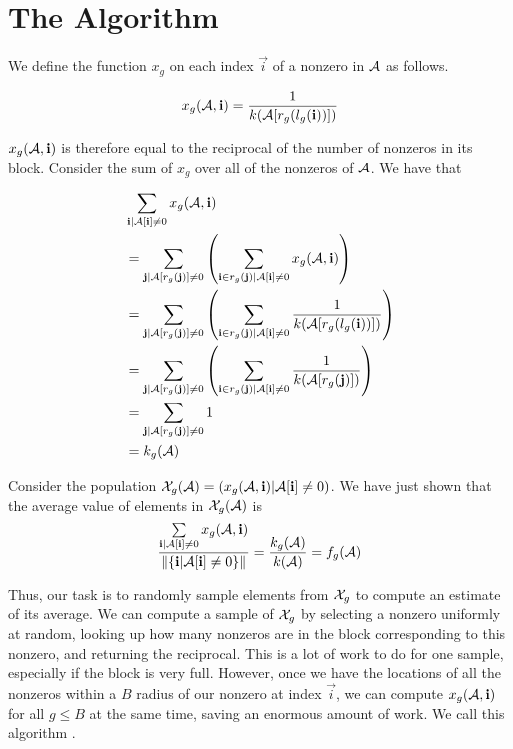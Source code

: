 
\section{The Algorithm}

    We define the function $x_g$ on each index $\vec{i}$ of a nonzero in $\mathbf{\mathcal{A}}$ as follows.

    \[
      x_g(\mathbf{\mathcal{A}}, \mathbf{i}) = \frac{1}{k(\mathbf{\mathcal{A}}[r_g(l_g(\mathbf{i}))])}
    \]

    $x_g(\mathbf{\mathcal{A}}, \mathbf{i})$ is therefore equal to the reciprocal of the number of nonzeros in its block. Consider the sum of $x_g$ over all of the nonzeros of $\mathbf{\mathcal{A}}$. We have that

    \begin{align*}
      &\sum\limits_{\mathbf{i} | \mathbf{\mathcal{A}}[\mathbf{i}] \neq 0} x_g(\mathbf{\mathcal{A}}, \mathbf{i})\\ &= \sum\limits_{\mathbf{j} | \mathbf{\mathcal{A}}[r_g(\mathbf{j})] \neq 0} \left(\sum\limits_{\mathbf{i} \in r_g(\mathbf{j}) | \mathbf{\mathcal{A}}[\mathbf{i}] \neq 0} x_g(\mathbf{\mathcal{A}}, \mathbf{i})\right)\\
      &= \sum\limits_{\mathbf{j} | \mathbf{\mathcal{A}}[r_g(\mathbf{j})] \neq 0} \left(\sum\limits_{\mathbf{i} \in r_g(\mathbf{j}) | \mathbf{\mathcal{A}}[\mathbf{i}] \neq 0} \frac{1}{k(\mathbf{\mathcal{A}}[r_g(l_g(\mathbf{i}))])}\right)\\
      &= \sum\limits_{\mathbf{j} | \mathbf{\mathcal{A}}[r_g(\mathbf{j})] \neq 0} \left(\sum\limits_{\mathbf{i} \in r_g(\mathbf{j}) | \mathbf{\mathcal{A}}[\mathbf{i}] \neq 0} \frac{1}{k(\mathbf{\mathcal{A}}[r_g(\mathbf{j})])}\right)\\
      &= \sum\limits_{\mathbf{j} | \mathbf{\mathcal{A}}[r_g(\mathbf{j})] \neq 0} 1\\
      &= k_g(\mathbf{\mathcal{A}})\\
    \end{align*}

    Consider the population $\mathcal{X}_g(\mathbf{\mathcal{A}}) = \left(x_g(\mathbf{\mathcal{A}}, \mathbf{i}) | \mathbf{\mathcal{A}}[\mathbf{i}] \neq 0\right)$. We have just shown that the average value of elements in $\mathcal{X}_g(\mathbf{\mathcal{A}})$ is
    \[
      \frac{\sum\limits_{\mathbf{i} | \mathbf{\mathcal{A}}[\mathbf{i}] \neq 0} x_g(\mathbf{\mathcal{A}}, \mathbf{i})}{\|\{\mathbf{i} | \mathbf{\mathcal{A}}[\mathbf{i}] \neq 0\}\|} = \frac{k_g(\mathbf{\mathcal{A}})}{k(\mathbf{\mathcal{A}})} = f_g(\mathbf{\mathcal{A}})
    \]

    Thus, our task is to randomly sample elements from $\mathcal{X}_g$ to compute an estimate of its average. We can compute a sample of $\mathcal{X}_g$ by selecting a nonzero uniformly at random, looking up how many nonzeros are in the block corresponding to this nonzero, and returning the reciprocal. This is a lot of work to do for one sample, especially if the block is very full. However, once we have the locations of all the nonzeros within a $B$ radius of our nonzero at index $\vec{i}$, we can compute $x_g(\mathbf{\mathcal{A}}, \mathbf{i})$ for all $g \leq B$ at the same time, saving an enormous amount of work. We call this algorithm .

